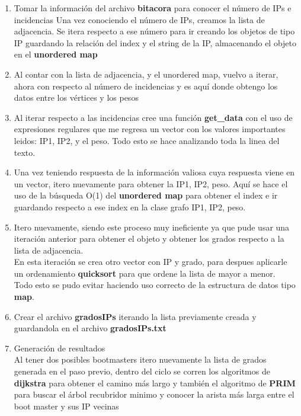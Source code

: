\documentclass{article}
\begin{document}
  \begin{enumerate}
  \item Tomar la información del archivo \textbf{bitacora} para conocer el número de IPs e incidencias
    Una vez conociendo el número de IPs, creamos la lista de adjacencia. Se itera respecto a ese número para ir creando los objetos de tipo IP guardando la relación del index y el string de la IP, almacenando el objeto en el \textbf{unordered map}
 
  \item Al contar con la lista de adjacencia, y el unordered map, vuelvo a iterar, ahora con respecto al número de incidencias y es aquí donde obtengo los datos entre los vértices y los pesos
    
  \item Al iterar respecto a las incidencias cree una función \textbf{get\_data} con el uso de expresiones regulares que me regresa un vector con los valores importantes leidos: IP1, IP2, y el peso. Todo esto se hace analizando toda la linea del texto.
    
  \item Una vez teniendo respuesta de la información valiosa cuya respuesta viene en un vector, itero nuevamente para obtener la IP1, IP2, peso. Aquí se hace el uso de la búsqueda O(1) del \textbf{unordered map} para obtener el index e ir guardando respecto a ese index en la clase grafo IP1, IP2, peso.

  \item Itero nuevamente, siendo este proceso muy ineficiente ya que pude usar una iteración anterior para obtener el objeto y obtener los grados respecto a la lista de adjacencia.\\
    En esta iteración se crea otro vector con IP y grado, para despues aplicarle un ordenamiento \textbf{quicksort} para que ordene la lista de mayor a menor.\\
    Todo esto se pudo evitar haciendo uso correcto de la estructura de datos tipo \textbf{map}.

  \item Crear el archivo \textbf{gradosIPs} iterando la lista previamente creada y guardandola en el archivo \textbf{gradosIPs.txt}

  \item Generación de resultados\\
    Al tener dos posibles bootmasters itero nuevamente la lista de grados generada en el paso previo, dentro del ciclo se corren los algoritmos de \textbf{dijkstra} para obtener el camino más largo y también el algoritmo de \textbf{PRIM} para buscar el árbol recubridor minimo y conocer la arista más larga entre el boot master y sus IP vecinas
    
  \end{enumerate}
\end{document}
